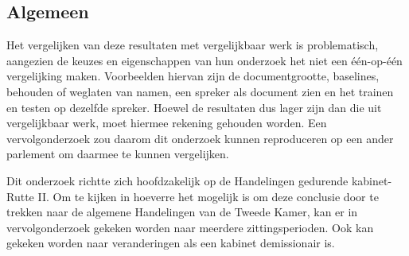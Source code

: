 \subsection{Algemeen}
Het vergelijken van deze resultaten met vergelijkbaar werk is problematisch, aangezien de keuzes en eigenschappen van hun onderzoek het niet een één-op-één vergelijking maken. Voorbeelden hiervan zijn de documentgrootte, baselines, behouden of weglaten van namen, een spreker als document zien en het trainen en testen op dezelfde spreker. Hoewel de resultaten dus lager zijn dan die uit vergelijkbaar werk, moet hiermee rekening gehouden worden. Een vervolgonderzoek zou daarom dit onderzoek kunnen reproduceren op een ander parlement om daarmee te kunnen vergelijken.\par
Dit onderzoek richtte zich hoofdzakelijk op de Handelingen gedurende kabinet-Rutte II. Om te kijken in hoeverre het mogelijk is om deze conclusie door te trekken naar de algemene Handelingen van de Tweede Kamer, kan er in vervolgonderzoek gekeken worden naar meerdere zittingsperioden. Ook kan gekeken worden naar veranderingen als een kabinet demissionair is.\par